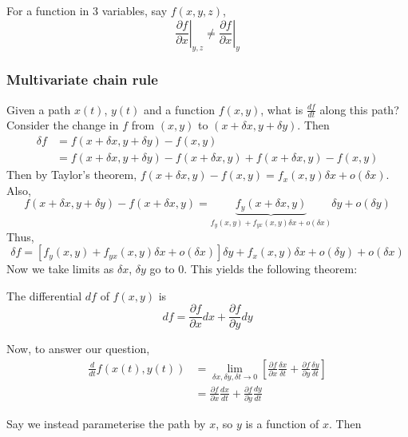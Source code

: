 \documentclass{../template/note}
\begin{document}
    \begin{remark*}
        For a function in 3 variables, say \(f(x, y, z)\),
        \[
            \left.\frac{\partial f}{\partial x}\right|_{y,z} \neq \left.\frac{\partial f}{\partial x}\right|_y
        \]        
    \end{remark*}
    
    \subsubsection{Multivariate chain rule}

    Given a path \(x(t)\), \(y(t)\) and a function \(f(x, y)\), what is \(\frac{df}{dt}\) along this path? Consider the change in \(f\) from \((x, y)\) to \((x + \delta x, y + \delta y)\). Then
    \begin{align*}
        \delta f &= f(x + \delta x, y + \delta y) - f(x, y) \\
        &= f(x + \delta x, y + \delta y) - f(x + \delta x, y) + f(x + \delta x, y) - f(x, y)
    \end{align*}
    Then by Taylor's theorem, \(f(x + \delta x, y) - f(x, y) = f_x(x, y) \delta x + o(\delta x)\). Also,
    \[
        f(x + \delta x, y + \delta y) - f(x + \delta x, y) = \underbrace{f_y(x + \delta x, y)}_{f_y(x, y) + f_{yx}(x, y) \delta x + o(\delta x)}\delta y + o(\delta y)
    \]
    Thus,
    \[
        \delta f = \left[f_y(x, y) + f_{yx}(x, y) \delta x + o(\delta x)\right]\delta y + f_x(x,y) \delta x + o(\delta y) + o(\delta x)
    \]
    Now we take limits as \(\delta x\), \(\delta y\) go to 0. This yields the following theorem:
    
    \begin{theorem}
        The differential \(df\) of \(f(x, y)\) is
        \[
            df = \frac{\partial f}{\partial x} dx + \frac{\partial f}{\partial y} dy
        \]
    \end{theorem}
    Now, to answer our question,
    \begin{align*}
        \frac{d}{dt} f(x(t), y(t)) &= \lim_{\delta x, \delta y, \delta t \to 0} \left[\frac{\partial f}{\partial x}\frac{\delta x}{\delta t} + \frac{\partial f}{\partial y}\frac{\delta y}{\delta t}\right] \\
        &= \frac{\partial f}{\partial x}\frac{dx}{dt} + \frac{\partial f}{\partial y}\frac{dy}{dt}
    \end{align*}
    
    Say we instead parameterise the path by \(x\), so \(y\) is a function of \(x\). Then
\end{document}
